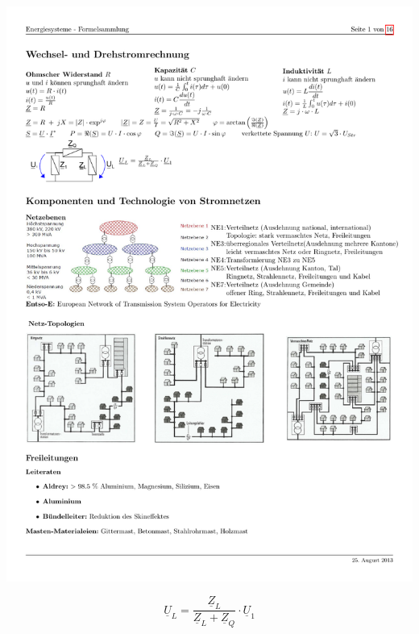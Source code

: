 \begin{minipage}[lt]{3.5cm}
	\includegraphics[width=\textwidth]{./images/WechselDrehstromrechnung.pdf}
\end{minipage}
\begin{minipage}[rt]{9cm}
	\begin{equation*}
		\underline{U}_L = \frac{\underline{Z}_L}{\underline{Z}_L + \underline{Z}_Q} \cdot \underline{U}_1
	\end{equation*}
\end{minipage}
  